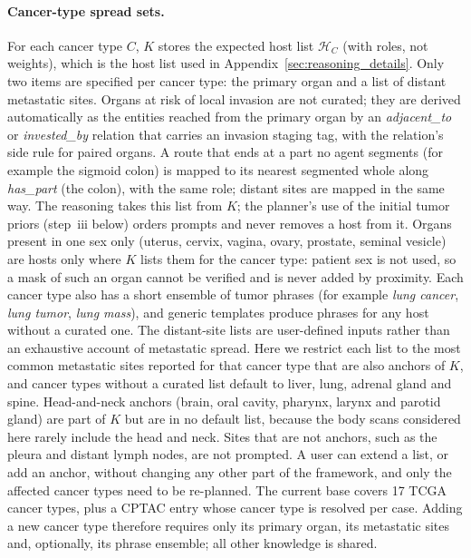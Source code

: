 \documentclass[fleqn,10pt]{olplainarticle}
\begin{document}
\paragraph{Cancer-type spread sets.}
For each cancer type $C$, $K$ stores the expected host list $\mathcal{H}_C$ (with roles, not weights), which is the host list used in
Appendix~\ref{sec:reasoning_details}. Only two items are specified per cancer type: the primary organ and a list of
distant metastatic sites. Organs at risk of local invasion are not curated; they are
derived automatically as the entities reached from the primary organ by an \emph{adjacent\_to} or \emph{invested\_by}
relation that carries an invasion staging tag, with the relation's side rule for paired organs. A route that ends at a part
no agent segments (for example the sigmoid colon) is mapped to its nearest segmented whole along \emph{has\_part} (the
colon), with the same role; distant sites are mapped in the same way. The reasoning takes this list from $K$; the
planner's use of the initial tumor priors (step~iii below) orders prompts and never removes a host from it. Organs present
in one sex only (uterus, cervix, vagina, ovary, prostate, seminal vesicle) are hosts only where $K$ lists them for the
cancer type: patient sex is not used, so a mask of such an organ cannot be verified and is never added by proximity. Each cancer type also has a short ensemble of tumor phrases (for example \emph{lung cancer}, \emph{lung
tumor}, \emph{lung mass}), and generic templates produce phrases for any host without a curated one. The distant-site lists are user-defined inputs rather than an exhaustive account of metastatic spread. Here we
restrict each list to the most common metastatic sites reported for that cancer type that are also anchors of $K$, and
cancer types without a curated list default to liver, lung, adrenal gland and spine. Head-and-neck anchors (brain, oral cavity,
pharynx, larynx and parotid gland) are part of $K$ but are in no default list, because the body scans considered here
rarely include the head and neck. Sites that are not anchors, such
as the pleura and distant lymph nodes, are not prompted. A user can extend a list, or add an anchor, without changing any other part of the framework, and only the affected cancer types need to be re-planned. The current
base covers 17 TCGA cancer types, plus a CPTAC entry whose cancer type is resolved per case. Adding a new cancer type
therefore requires only its primary organ, its metastatic sites and, optionally, its phrase ensemble; all other
knowledge is shared.
\end{document}
